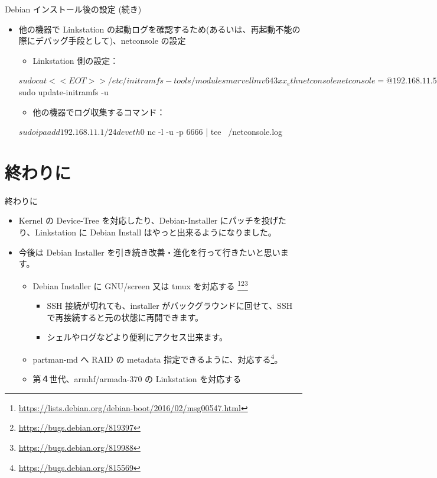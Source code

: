 \begin{frame}[containsverbatim]{Debian インストール後の設定 (続き)}
\begin{itemize}
\item 他の機器で Linkstation の起動ログを確認するため(あるいは、再起動不能の際にデバッグ手段として)、netconsole の設定
	\begin{itemize}
	\item Linkstation 側の設定：
	\end{itemize}
\begin{commandline}
$ sudo cat << EOT >> /etc/initramfs-tools/modules
marvell
mv643xx_eth
netconsole netconsole=@192.168.11.5/,6666@192.168.11.1/
mvmdio
EOT

$ sudo update-initramfs -u
\end{commandline}
	\begin{itemize}
	\item 他の機器でログ収集するコマンド：
	\end{itemize}
\begin{commandline}
$ sudo ip a add 192.168.11.1/24 dev eth0
$ nc -l -u -p 6666 | tee ~/netconsole.log
\end{commandline}
\end{itemize}
\end{frame}


\section{終わりに}

\begin{frame}{終わりに}
\begin{itemize}
\item Kernel の Device-Tree を対応したり、Debian-Installer にパッチを投げたり、Linkstation に Debian Install はやっと出来るようになりました。
\item 今後は Debian Installer を引き続き改善・進化を行って行きたいと思います。
	\begin{itemize}
	\item Debian Installer に GNU/screen 又は tmux を対応する
	\footnote{\url{https://lists.debian.org/debian-boot/2016/02/msg00547.html}}\footnote{\url{https://bugs.debian.org/819397}}\footnote{\url{https://bugs.debian.org/819988}}
		\begin{itemize}
		\item SSH 接続が切れても、installer がバックグラウンドに回せて、SSH で再接続すると元の状態に再開できます。
		\item シェルやログなどより便利にアクセス出来ます。
		\end{itemize}
	\item partman-md へ RAID の metadata 指定できるように、対応する\footnote{\url{https://bugs.debian.org/815569}}。
	\item 第４世代、armhf/armada-370 の Linkstation を対応する
	\end{itemize}
\end{itemize}
\end{frame}


